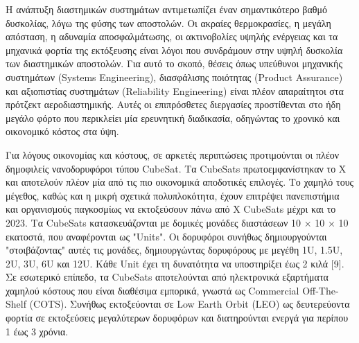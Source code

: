 \documentclass[a4paper,nobib,justified]{tufte-book}
\begin{document}
Η ανάπτυξη διαστημικών συστημάτων αντιμετωπίζει έναν σημαντικότερο βαθμό δυσκολίας, λόγω της φύσης των αποστολών. Οι ακραίες θερμοκρασίες, η μεγάλη απόσταση, η αδυναμία αποσφαλμάτωσης, οι ακτινοβολίες υψηλής ενέργειας και τα μηχανικά φορτία της εκτόξευσης είναι λόγοι που συνδράμουν στην υψηλή δυσκολία των διαστημικών αποστολών. Για αυτό το σκοπό, θέσεις όπως υπεύθυνοι μηχανικής συστημάτων (Systems Engineering), διασφάλισης ποιότητας (Product Assurance) και αξιοπιστίας συστημάτων (Reliability Engineering) είναι πλέον απαραίτητοι στα πρότζεκτ αεροδιαστημικής. Αυτές οι επιπρόσθετες διεργασίες προστίθενται στο ήδη μεγάλο φόρτο που περικλείει μία ερευνητική διαδικασία, οδηγώντας το χρονικό και οικονομικό κόστος στα ύψη.

Για λόγους οικονομίας και κόστους, σε αρκετές περιπτώσεις προτιμούνται οι πλέον δημοφιλείς νανοδορυφόροι τύπου CubeSat. Τα CubeSats πρωτοεμφανίστηκαν το Χ και αποτελούν πλέον μία από τις πιο οικονομικά αποδοτικές επιλογές. Το χαμηλό τους μέγεθος, καθώς και η μικρή σχετικά πολυπλοκότητα, έχουν επιτρέψει πανεπιστήμια και οργανισμούς παγκοσμίως να εκτοξεύσουν πάνω από X CubeSats μέχρι και το 2023. %
Τα CubeSats κατασκευάζονται με δομικές μονάδες διαστάσεων 10 × 10 × 10 εκατοστά, που αναφέρονται ως "Units". Οι δορυφόροι συνήθως δημιουργούνται "στοιβάζοντας" αυτές τις μονάδες, δημιουργώντας δορυφόρους με μεγέθη 1U, 1.5U, 2U, 3U, 6U και 12U. Κάθε Unit έχει τη δυνατότητα να υποστηρίξει έως 2 κιλά [9]. Σε εσωτερικό επίπεδο, τα CubeSats αποτελούνται από ηλεκτρονικά εξαρτήματα χαμηλού κόστους που είναι διαθέσιμα εμπορικά, γνωστά ως Commercial Off-The-Shelf (COTS). Συνήθως εκτοξεύονται σε Low Earth Orbit (LEO) ως δευτερεύοντα φορτία σε εκτοξεύσεις μεγαλύτερων δορυφόρων και διατηρούνται ενεργά για περίπου 1 έως 3 χρόνια.
\end{document}

